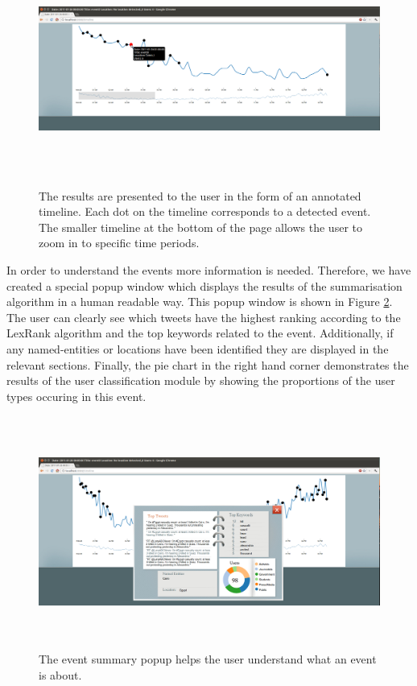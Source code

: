 \begin{figure}[htbp]
  \begin{center}
    \includegraphics[height=3in, width=6in]{pythia2}
    \caption{The results are presented to the user in the form of an annotated timeline. Each dot on the timeline corresponds to a detected event. The smaller timeline at the bottom of the page allows the    user to zoom in to specific time periods.}
    \label{Pythia2}
  \end{center}
\end{figure} 
In order to understand the events more information is needed. Therefore, we have created a special popup window which displays the results of the summarisation algorithm in a human readable way. This popup window is shown in Figure \ref{Pythia3}. The user can clearly see which tweets have the highest ranking according to the LexRank algorithm and the top keywords related to the event. Additionally, if any named-entities or locations have been identified they are displayed in the relevant sections. Finally, the pie chart in the right hand corner demonstrates the results of the user classification module by showing the proportions of the user types occuring in this event.    
\begin{figure}[htbp]
  \begin{center}
    \includegraphics[height=3in, width=6in]{pythia3}
    \caption{The event summary popup helps the user understand what an event is about.}
    \label{Pythia3}
  \end{center}
\end{figure} 


